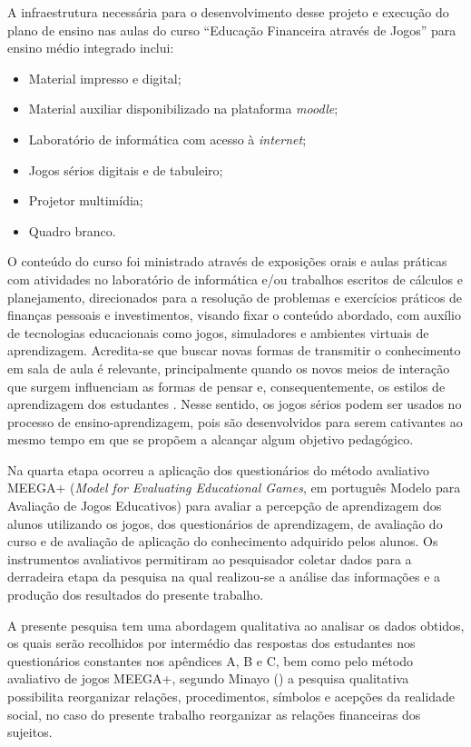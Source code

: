 A infraestrutura necessária para o desenvolvimento desse projeto e execução do plano de ensino nas aulas do curso “Educação Financeira através de Jogos” para ensino médio integrado inclui:

\begin{itemize}
    \item Material impresso e digital;
    \item Material auxiliar disponibilizado na plataforma \textit{moodle};
    \item Laboratório de informática com acesso à \textit{internet};
    \item Jogos sérios digitais e de tabuleiro;
    \item Projetor multimídia;
    \item Quadro branco.
\end{itemize}

O conteúdo do curso foi ministrado através de exposições orais e aulas práticas com atividades no laboratório de informática e/ou trabalhos escritos de cálculos e planejamento, direcionados para a resolução de problemas e exercícios práticos de finanças pessoais e investimentos, visando fixar o conteúdo abordado, com auxílio de tecnologias educacionais como jogos, simuladores e ambientes virtuais de aprendizagem. Acredita-se que buscar novas formas de transmitir o conhecimento em sala de aula é relevante, principalmente quando os novos meios de interação que surgem influenciam as formas de pensar e, consequentemente, os estilos de aprendizagem dos estudantes \cite{prensky2012}. Nesse sentido, os jogos sérios podem ser usados no processo de ensino-aprendizagem, pois são desenvolvidos para serem cativantes ao mesmo tempo em que se propõem a alcançar algum objetivo pedagógico.

Na quarta etapa ocorreu a aplicação dos questionários do método avaliativo MEEGA+ (\textit{Model for Evaluating Educational Games}, em português Modelo para Avaliação de Jogos Educativos) para avaliar a percepção de aprendizagem dos alunos utilizando os jogos, dos questionários de aprendizagem, de avaliação do curso e de avaliação de aplicação do conhecimento adquirido pelos alunos. Os instrumentos avaliativos permitiram ao pesquisador coletar dados para a derradeira etapa da pesquisa na qual realizou-se a análise das informações e a produção dos resultados do presente trabalho.

A presente pesquisa tem uma abordagem qualitativa ao analisar os dados obtidos, os quais serão recolhidos por intermédio das respostas dos estudantes nos questionários constantes nos apêndices A, B e C, bem como pelo método avaliativo de jogos MEEGA+, segundo Minayo (\citeyear{minayo2008}) a pesquisa qualitativa possibilita reorganizar relações, procedimentos, símbolos e acepções da realidade social, no caso do presente trabalho reorganizar as relações financeiras dos sujeitos.

